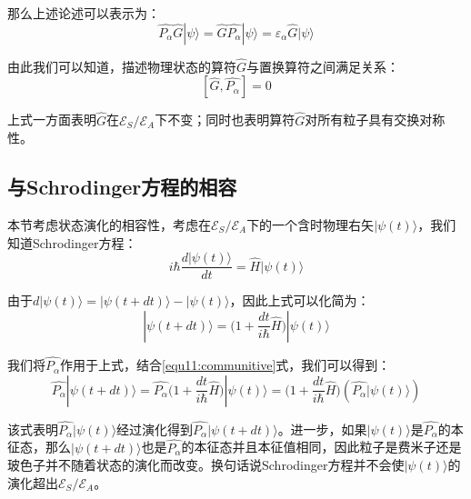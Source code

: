         那么上述论述可以表示为：
        \begin{equation}
            \hat{P_\alpha}\hat{G}|\psi\rangle=\hat{G}\hat{P_\alpha}|\psi\rangle=\varepsilon_\alpha\hat{G}|\psi\rangle
        \end{equation}
        
        由此我们可以知道，描述物理状态的算符$\hat{G}$与置换算符之间满足关系：
        \begin{equation}\label{equ11:communitive}
            [\hat{G},\hat{P_\alpha}]=0
        \end{equation}
        
        上式一方面表明$\hat{G}$在$\mathscr{E}_S/\mathscr{E}_A$下不变；同时也表明算符$\hat{G}$对所有粒子具有交换对称性。
        
        \subsection{与Schrodinger方程的相容}
        本节考虑状态演化的相容性，考虑在$\mathscr{E}_S/\mathscr{E}_A$下的一个含时物理右矢$|\psi(t)\rangle$，我们知道Schrodinger方程：
        \begin{equation}
            i\hbar\frac{d|\psi(t)\rangle}{dt}=\hat{H}|\psi(t)\rangle
        \end{equation}
        
        由于$d|\psi(t)\rangle=|\psi(t+dt)\rangle-|\psi(t)\rangle$，因此上式可以化简为：
        \begin{equation}
            |\psi(t+dt)\rangle=\big(1+\frac{dt}{i\hbar}\hat{H}\big)|\psi(t)\rangle
        \end{equation}
        
        我们将$\hat{P_\alpha}$作用于上式，结合\eqref{equ11:communitive}式，我们可以得到：
        \begin{equation}
            \hat{P_\alpha}|\psi(t+dt)\rangle=\hat{P_\alpha}\big(1+\frac{dt}{i\hbar}\hat{H}\big)|\psi(t)\rangle=\big(1+\frac{dt}{i\hbar}\hat{H}\big)(\hat{P_\alpha}|\psi(t)\rangle)
        \end{equation}
        
        该式表明$\hat{P_\alpha}|\psi(t)\rangle$经过演化得到$\hat{P_\alpha}|\psi(t+dt)\rangle$。进一步，如果$|\psi(t)\rangle$是$\hat{P_\alpha}$的本征态，那么$|\psi(t+dt)\rangle$也是$\hat{P_\alpha}$的本征态并且本征值相同，因此粒子是费米子还是玻色子并不随着状态的演化而改变。换句话说Schrodinger方程并不会使$|\psi(t)\rangle$的演化超出$\mathscr{E}_S/\mathscr{E}_A$。